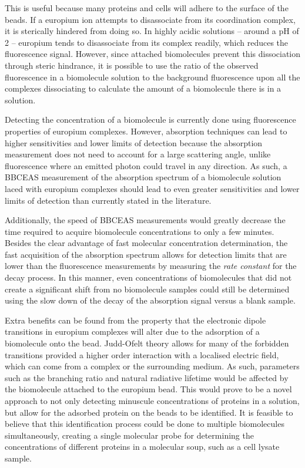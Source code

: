 This is useful because many proteins and cells will adhere to the surface of
the beads. If a europium ion attempts to disassociate from its coordination
complex, it is sterically hindered from doing so. In highly acidic solutions --
around a pH of 2 -- europium tends to disassociate from its complex readily,
which reduces the fluorescence signal. However, since attached biomolecules
prevent this dissociation through steric hindrance, it is possible to use the
ratio of the observed fluorescence in a biomolecule solution to the background
fluorescence upon all the complexes dissociating to calculate the amount of a
biomolecule there is in a solution.

Detecting the concentration of a biomolecule is currently done using
fluorescence properties of europium complexes. However, absorption techniques
can lead to higher sensitivities and lower limits of detection because the
absorption measurement does not need to account for a large scattering angle,
unlike fluorescence where an emitted photon could travel in any
direction. As such, a \ac{BBCEAS} measurement of the
absorption spectrum of a biomolecule solution laced with europium complexes
should lead to even greater sensitivities and lower limits of detection than
currently stated in the literature.

Additionally, the speed of \ac{BBCEAS} measurements would greatly decrease the
time required to acquire biomolecule concentrations to only a few minutes.
Besides the clear advantage of fast molecular concentration determination, the
fast acquisition of the absorption spectrum allows for detection limits that
are lower than the fluorescence measurements by measuring the \emph{rate
constant} for the decay process. In this manner, even concentrations of
biomolecules that did not create a significant shift from no biomolecule
samples could still be determined using the slow down of the decay of the
absorption signal versus a blank sample.

Extra benefits can be found from the property that the electronic dipole
transitions in europium complexes will alter due to the adsorption of a
biomolecule onto the bead. Judd-Ofelt theory allows for many of the forbidden
transitions provided a higher order interaction with a localised electric
field, which can come from a complex or the surrounding medium. As such,
parameters such as the branching ratio and natural radiative lifetime would be
affected by the biomolecule attached to the europium bead.  This would prove to
be a novel approach to not only detecting minuscule concentrations of proteins
in a solution, but allow for the adsorbed protein on the beads to be
identified. It is feasible to believe that this identification process could be
done to multiple biomolecules simultaneously, creating a single molecular probe
for determining the concentrations of different proteins in a molecular soup,
such as a cell lysate sample.

